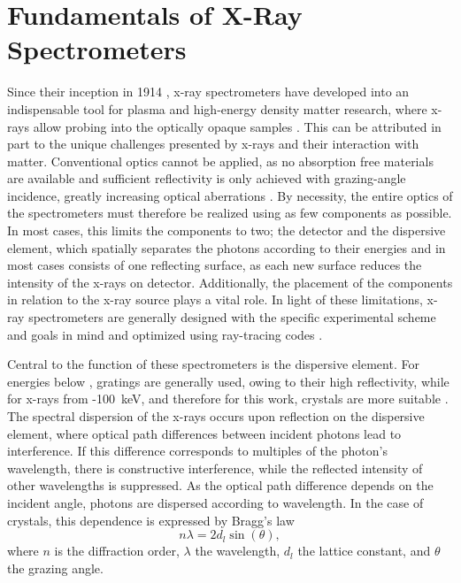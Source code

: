 \chapter{Fundamentals of X-Ray Spectrometers}
\label{section: theory}

Since their inception in 1914 \citep{bragg1914x}, x-ray spectrometers 
have 
developed into an indispensable tool for plasma and high-energy 
density matter 
research, where x-rays allow probing into the optically opaque samples \cite{renner2019challenges}. This can be attributed in part 
to the 
unique challenges presented by x-rays and their interaction with 
matter. 
Conventional optics cannot be applied, as no absorption free 
materials are 
available and sufficient reflectivity is only achieved with 
grazing-angle 
incidence, greatly increasing optical aberrations 
\citep{kunze2009introduction}. By necessity, the entire optics of 
the 
spectrometers must therefore be realized using as few components as 
possible. 
In most cases, this limits the components to two; the 
detector and the dispersive element, which spatially separates the 
photons 
according to their energies and in most cases consists of one 
reflecting 
surface, as each new surface reduces the intensity of the x-rays on 
detector. Additionally, the placement of the components in relation to the x-ray source plays a vital role. In light of these limitations, x-ray spectrometers 
are generally designed with the specific experimental scheme and 
goals in mind 
and optimized using ray-tracing codes \citep{renner2019challenges}.

Central to the function of these spectrometers is the dispersive 
element. For 
energies below , gratings are 
generally used, 
owing to their high reflectivity, while for x-rays from 
-\SI{100}{\kilo\electronvolt}, and 
therefore for this work, crystals are more suitable
\citep{renner2019challenges}. The spectral dispersion of the x-rays 
occurs upon 
reflection on the 
dispersive element, where optical path differences between incident 
photons 
lead to interference. If this difference corresponds to multiples of 
the 
photon's wavelength, there is constructive interference, while the 
reflected 
intensity of other wavelengths is suppressed. As the optical path 
difference 
depends on the incident angle, photons are dispersed according to 
wavelength. 
In the case of crystals, this dependence is expressed by Bragg's law 
\citep{yang2011focusing}
\begin{equation}
	n\lambda = 2d_l\sin(\theta),
	\label{Bragg}
\end{equation}
where $n$ is the diffraction order, $\lambda$ the wavelength, $d_l$ 
the lattice 
constant, and $\theta$ the grazing angle.

